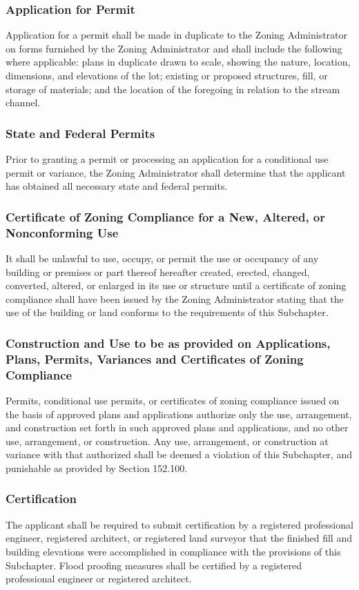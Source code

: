 \subsubsection{Application for Permit}
Application for a permit shall be made in duplicate to the Zoning Administrator on forms furnished by the Zoning Administrator and shall include the following where applicable: plans in duplicate drawn to scale, showing the nature, location, dimensions, and elevations of the lot; existing or proposed structures, fill, or storage of materials; and the location of the foregoing in relation to the stream channel.
\subsubsection{State and Federal Permits}
Prior to granting a permit or processing an application for a conditional use permit or variance, the Zoning Administrator shall determine that the applicant has obtained all necessary state and federal permits.
\subsubsection{Certificate of Zoning Compliance for a New, Altered, or Nonconforming Use}
It shall be unlawful to use, occupy, or permit the use or occupancy of any building or premises or part thereof hereafter created, erected, changed, converted, altered, or enlarged in its use or structure until a certificate of zoning compliance shall have been issued by the Zoning Administrator stating that the use of the building or land conforms to the requirements of this Subchapter.
\subsubsection{Construction and Use to be as provided on Applications, Plans, Permits, Variances and Certificates of Zoning Compliance}
Permits, conditional use permits, or certificates of zoning compliance issued on the basis of approved plans and applications authorize only the use, arrangement, and construction set forth in such approved plans and applications, and no other use, arrangement, or construction. Any use, arrangement, or construction at variance with that authorized shall be deemed a violation of this Subchapter, and punishable as provided by Section 152.100.
\subsubsection{Certification}
The applicant shall be required to submit certification by a registered professional engineer, registered architect, or registered land surveyor that the finished fill and building elevations were accomplished in compliance with the provisions of this Subchapter. Flood proofing measures shall be certified by a registered professional engineer or registered architect.
